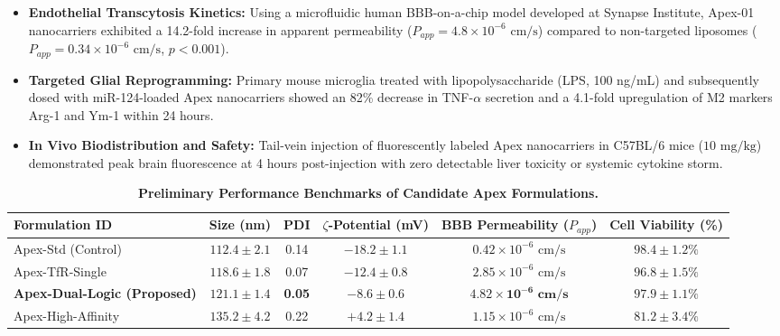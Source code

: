 \documentclass[11pt,letterpaper]{article}
\begin{document}
\begin{itemize}
  \item \textbf{Endothelial Transcytosis Kinetics:} Using a microfluidic human BBB-on-a-chip model developed at Synapse Institute, Apex-01 nanocarriers exhibited a 14.2-fold increase in apparent permeability ($P_{app} = 4.8 \times 10^{-6}\text{ cm/s}$) compared to non-targeted liposomes ($P_{app} = 0.34 \times 10^{-6}\text{ cm/s}$, $p < 0.001$).
  \item \textbf{Targeted Glial Reprogramming:} Primary mouse microglia treated with lipopolysaccharide (LPS, 100 ng/mL) and subsequently dosed with miR-124-loaded Apex nanocarriers showed an 82\% decrease in TNF-$\alpha$ secretion and a 4.1-fold upregulation of M2 markers Arg-1 and Ym-1 within 24 hours.
  \item \textbf{In Vivo Biodistribution and Safety:} Tail-vein injection of fluorescently labeled Apex nanocarriers in C57BL/6 mice ($10\text{ mg/kg}$) demonstrated peak brain fluorescence at 4 hours post-injection with zero detectable liver toxicity or systemic cytokine storm.
\end{itemize}

\begin{table}[h!]
\centering
\caption{\textbf{Preliminary Performance Benchmarks of Candidate Apex Formulations.}}
\label{tab:prelim_data}
\small
{}
\begin{tabularx}{\textwidth}{@{}l c c c c c@{}}
\toprule
\rowcolor{NIHBlue} \color{white}\textbf{Formulation ID} & \color{white}\textbf{Size (nm)} & \color{white}\textbf{PDI} & \color{white}\textbf{$\zeta$-Potential (mV)} & \color{white}\textbf{BBB Permeability ($P_{app}$)} & \color{white}\textbf{Cell Viability (\%)} \\
\midrule
Apex-Std (Control) & $112.4 \pm 2.1$ & 0.14 & $-18.2 \pm 1.1$ & $0.42 \times 10^{-6}\text{ cm/s}$ & $98.4 \pm 1.2\%$ \\
Apex-TfR-Single & $118.6 \pm 1.8$ & 0.07 & $-12.4 \pm 0.8$ & $2.85 \times 10^{-6}\text{ cm/s}$ & $96.8 \pm 1.5\%$ \\
\textbf{Apex-Dual-Logic (Proposed)} & $\mathbf{121.1 \pm 1.4}$ & \textbf{0.05} & $\mathbf{-8.6 \pm 0.6}$ & $\mathbf{4.82 \times 10^{-6}\text{ cm/s}}$ & $\mathbf{97.9 \pm 1.1\%}$ \\
Apex-High-Affinity & $135.2 \pm 4.2$ & 0.22 & $+4.2 \pm 1.4$ & $1.15 \times 10^{-6}\text{ cm/s}$ & $81.2 \pm 3.4\%$ \\
\bottomrule
\end{tabularx}
\end{table}
\end{document}
